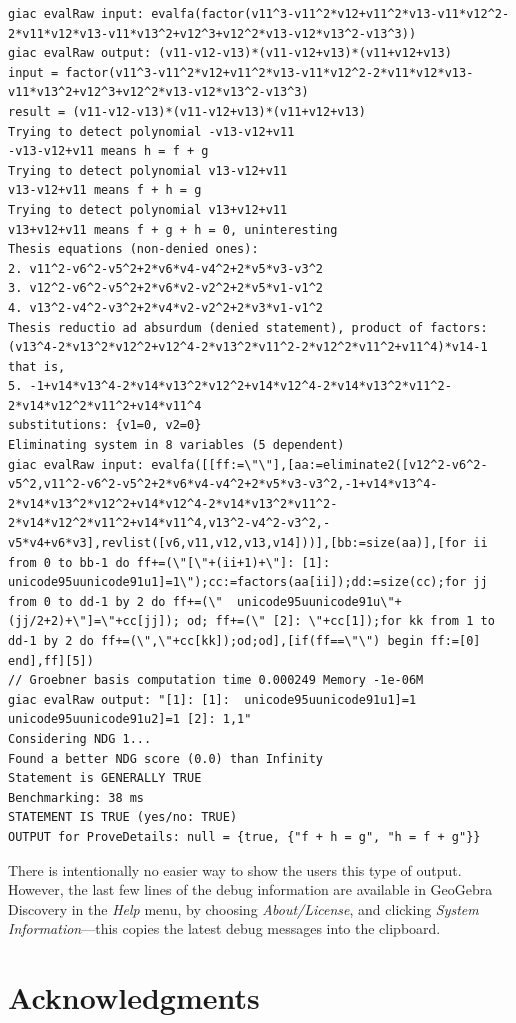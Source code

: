 \documentclass{article}
\begin{document}
{\begin{lstlisting}[language=mylog]
giac evalRaw input: evalfa(factor(v11^3-v11^2*v12+v11^2*v13-v11*v12^2-2*v11*v12*v13-v11*v13^2+v12^3+v12^2*v13-v12*v13^2-v13^3))
giac evalRaw output: (v11-v12-v13)*(v11-v12+v13)*(v11+v12+v13)
input = factor(v11^3-v11^2*v12+v11^2*v13-v11*v12^2-2*v11*v12*v13-v11*v13^2+v12^3+v12^2*v13-v12*v13^2-v13^3)
result = (v11-v12-v13)*(v11-v12+v13)*(v11+v12+v13)
Trying to detect polynomial -v13-v12+v11
-v13-v12+v11 means h = f + g
Trying to detect polynomial v13-v12+v11
v13-v12+v11 means f + h = g
Trying to detect polynomial v13+v12+v11
v13+v12+v11 means f + g + h = 0, uninteresting
Thesis equations (non-denied ones):
2. v11^2-v6^2-v5^2+2*v6*v4-v4^2+2*v5*v3-v3^2
3. v12^2-v6^2-v5^2+2*v6*v2-v2^2+2*v5*v1-v1^2
4. v13^2-v4^2-v3^2+2*v4*v2-v2^2+2*v3*v1-v1^2
Thesis reductio ad absurdum (denied statement), product of factors:
(v13^4-2*v13^2*v12^2+v12^4-2*v13^2*v11^2-2*v12^2*v11^2+v11^4)*v14-1
that is,
5. -1+v14*v13^4-2*v14*v13^2*v12^2+v14*v12^4-2*v14*v13^2*v11^2-2*v14*v12^2*v11^2+v14*v11^4
substitutions: {v1=0, v2=0}
Eliminating system in 8 variables (5 dependent)
giac evalRaw input: evalfa([[ff:=\"\"],[aa:=eliminate2([v12^2-v6^2-v5^2,v11^2-v6^2-v5^2+2*v6*v4-v4^2+2*v5*v3-v3^2,-1+v14*v13^4-2*v14*v13^2*v12^2+v14*v12^4-2*v14*v13^2*v11^2-2*v14*v12^2*v11^2+v14*v11^4,v13^2-v4^2-v3^2,-v5*v4+v6*v3],revlist([v6,v11,v12,v13,v14]))],[bb:=size(aa)],[for ii from 0 to bb-1 do ff+=(\"[\"+(ii+1)+\"]: [1]:  unicode95uunicode91u1]=1\");cc:=factors(aa[ii]);dd:=size(cc);for jj from 0 to dd-1 by 2 do ff+=(\"  unicode95uunicode91u\"+(jj/2+2)+\"]=\"+cc[jj]); od; ff+=(\" [2]: \"+cc[1]);for kk from 1 to dd-1 by 2 do ff+=(\",\"+cc[kk]);od;od],[if(ff==\"\") begin ff:=[0] end],ff][5])
// Groebner basis computation time 0.000249 Memory -1e-06M
giac evalRaw output: "[1]: [1]:  unicode95uunicode91u1]=1  unicode95uunicode91u2]=1 [2]: 1,1"
Considering NDG 1...
Found a better NDG score (0.0) than Infinity
Statement is GENERALLY TRUE
Benchmarking: 38 ms
STATEMENT IS TRUE (yes/no: TRUE)
OUTPUT for ProveDetails: null = {true, {"f + h = g", "h = f + g"}}
\end{lstlisting}
} %
There is intentionally no easier way to show the users this type of output. However, the last few lines of the debug information are available in GeoGebra Discovery in the \textit{Help} menu, by choosing \textit{About/License}, and clicking \textit{System Information}---this copies the latest debug messages into the clipboard.

\section*{Acknowledgments}
\end{document}
